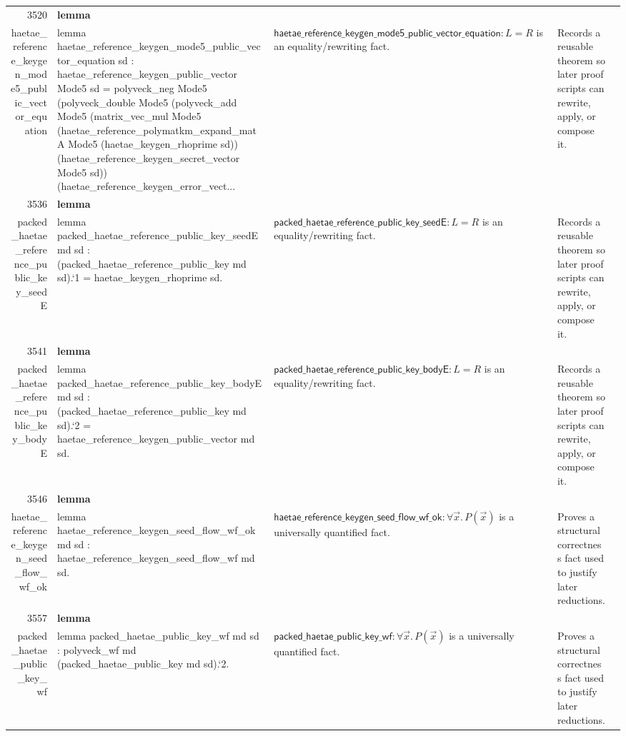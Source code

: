 \documentclass[10pt]{article}
\newcommand{\ec}[1]{\begingroup\ttfamily\scriptsize #1\endgroup}
\begin{document}
\begin{longtable}{r L{0.17\textwidth} L{0.26\textwidth} L{0.27\textwidth} L{0.20\textwidth}}
3520 & \textbf{lemma}\\\ec{haetae\_reference\_keygen\_mode5\_public\_vector\_equation} & \ec{lemma haetae\_reference\_keygen\_mode5\_public\_vector\_equation sd : haetae\_reference\_keygen\_public\_vector Mode5 sd = polyveck\_neg Mode5 (polyveck\_double Mode5 (polyveck\_add Mode5 (matrix\_vec\_mul Mode5 (haetae\_reference\_polymatkm\_expand\_matA Mode5 (haetae\_keygen\_rhoprime sd)) (haetae\_reference\_keygen\_secret\_vector Mode5 sd)) (haetae\_reference\_keygen\_error\_vect...} & \(\mathsf{haetae\_reference\_keygen\_mode5\_public\_vector\_equation} : L = R\) is an equality/rewriting fact. & Records a reusable theorem so later proof scripts can rewrite, apply, or compose it. \\
3536 & \textbf{lemma}\\\ec{packed\_haetae\_reference\_public\_key\_seedE} & \ec{lemma packed\_haetae\_reference\_public\_key\_seedE md sd : (packed\_haetae\_reference\_public\_key md sd).`1 = haetae\_keygen\_rhoprime sd.} & \(\mathsf{packed\_haetae\_reference\_public\_key\_seedE} : L = R\) is an equality/rewriting fact. & Records a reusable theorem so later proof scripts can rewrite, apply, or compose it. \\
3541 & \textbf{lemma}\\\ec{packed\_haetae\_reference\_public\_key\_bodyE} & \ec{lemma packed\_haetae\_reference\_public\_key\_bodyE md sd : (packed\_haetae\_reference\_public\_key md sd).`2 = haetae\_reference\_keygen\_public\_vector md sd.} & \(\mathsf{packed\_haetae\_reference\_public\_key\_bodyE} : L = R\) is an equality/rewriting fact. & Records a reusable theorem so later proof scripts can rewrite, apply, or compose it. \\
3546 & \textbf{lemma}\\\ec{haetae\_reference\_keygen\_seed\_flow\_wf\_ok} & \ec{lemma haetae\_reference\_keygen\_seed\_flow\_wf\_ok md sd : haetae\_reference\_keygen\_seed\_flow\_wf md sd.} & \(\mathsf{haetae\_reference\_keygen\_seed\_flow\_wf\_ok} : \forall \vec{x}.\, P(\vec{x})\) is a universally quantified fact. & Proves a structural correctness fact used to justify later reductions. \\
3557 & \textbf{lemma}\\\ec{packed\_haetae\_public\_key\_wf} & \ec{lemma packed\_haetae\_public\_key\_wf md sd : polyveck\_wf md (packed\_haetae\_public\_key md sd).`2.} & \(\mathsf{packed\_haetae\_public\_key\_wf} : \forall \vec{x}.\, P(\vec{x})\) is a universally quantified fact. & Proves a structural correctness fact used to justify later reductions. \\

\end{longtable}
\end{document}
